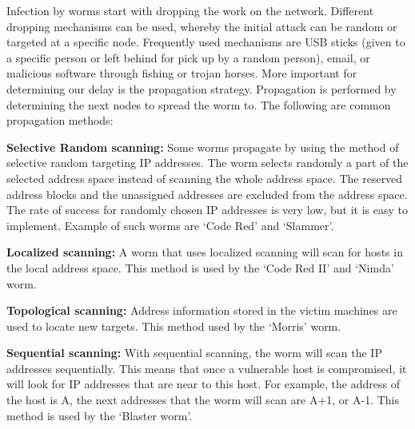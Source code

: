 Infection by worms start with dropping the work on the network. Different dropping mechanisms can be used, whereby the initial attack can be random or targeted at a specific node. Frequently used mechanisms are USB sticks (given to a specific person or left behind for pick up by a random person), email, or malicious software through fishing or trojan horses. More important for determining our delay is the propagation strategy. Propagation is performed by determining the next nodes to spread the worm to. The following are common propagation methods: 
\begin{description}
\item \textbf{Selective Random scanning:} Some worms propagate by using the method of selective random targeting IP addresses. The worm selects randomly a part of the selected address space instead of scanning the whole address space. The reserved address blocks and the unassigned addresses are excluded from the address space. The rate of success for randomly chosen IP addresses is very low, but it is easy to implement. Example of such worms are `Code Red' and `Slammer'.
\item \textbf{Localized scanning:} A worm that uses localized scanning will scan for hosts in the local address space. This method is used by the `Code Red II' and `Nimda' worm.
\item \textbf{Topological scanning:} Address information stored in the victim machines are used to locate new targets. This method used by the `Morris' worm.
\item \textbf{Sequential scanning:}
With sequential scanning, the worm will scan the IP addresses sequentially. This means that once a vulnerable host is compromised, it will look for IP addresses that are near to this host. For example, the address of the host is A, the next addresses that the worm will scan are A+1, or A-1. This method is used by the `Blaster worm'.

\end{description}
